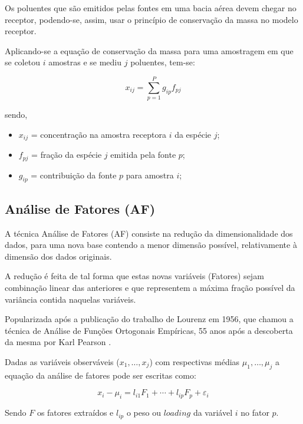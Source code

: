 Os poluentes que são emitidos pelas fontes em uma bacia aérea devem chegar no 
receptor, podendo-se, assim, usar o princípio de conservação da massa 
no modelo receptor. 

Aplicando-se a equação de conservação da massa para uma amostragem em que se 
coletou $i$ amostras e se mediu $j$ poluentes, tem-se:

\begin{equation}
  \label{eq:conservacaomassa}
  x_{ij} = \sum_{p=1}^{P} g_{ip}f_{pj} %
\end{equation} 

sendo,
\begin{itemize}
  \item $x_{ij}$ = concentração na amostra receptora $i$ da espécie $j$;
  \item $f_{pj}$ = fração da espécie $j$ emitida pela fonte $p$;
  \item $g_{ip}$ = contribuição da fonte $p$ para amostra $i$;
\end{itemize}

\subsection{Análise de Fatores (AF)}

A técnica Análise de Fatores (AF) consiste na redução da dimensionalidade dos dados, 
para uma nova base contendo a menor dimensão possível, 
relativamente à dimensão dos dados originais.

A redução é feita de tal forma que estas novas variáveis (Fatores) 
sejam combinação linear das anteriores e que representem a máxima fração possível
da variância contida naquelas variáveis.

Popularizada após a publicação do trabalho de Lourenz em 1956, que chamou 
a técnica de Análise de Funções Ortogonais Empíricas, 55 anos após a 
descoberta da mesma por Karl Pearson \citep{bartholomew2011}.

Dadas as variáveis observáveis ($x_1,\dots,x_j$) com 
respectivas médias $\mu_1,\dots,\mu_j$ a equação da análise de fatores 
pode ser escritas como: 
 
\begin{equation}
  \label{eq:af}
  x_i-\mu_i = l_{i1} F_1 + \cdots + l_{ip} F_p + \varepsilon_i 
\end{equation}

Sendo $F$ os fatores extraídos e $l_{ip}$ o peso ou $loading$ 
da variável $i$ no fator $p$.

